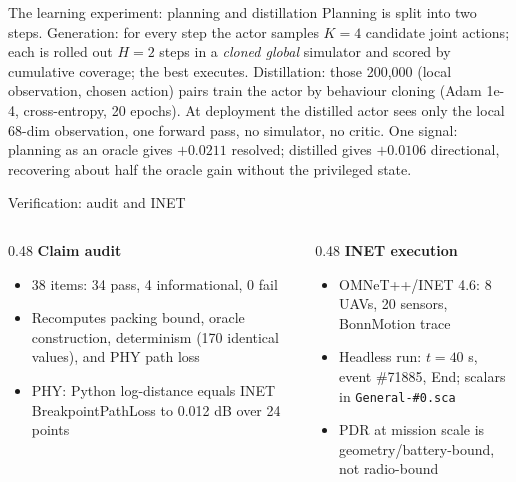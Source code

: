 \documentclass[aspectratio=169,10pt]{beamer}
\begin{document}
\begin{frame}{The learning experiment: planning and distillation}
  \small
  Planning is split into two steps. Generation: for every step the actor samples $K=4$ candidate joint actions; each is rolled out $H=2$ steps in a \emph{cloned global} simulator and scored by cumulative coverage; the best executes. Distillation: those 200,000 (local observation, chosen action) pairs train the actor by behaviour cloning (Adam 1e-4, cross-entropy, 20 epochs). At deployment the distilled actor sees only the local 68-dim observation, one forward pass, no simulator, no critic. One signal: planning as an oracle gives $+0.0211$ resolved; distilled gives $+0.0106$ directional, recovering about half the oracle gain without the privileged state.
\end{frame}

\begin{frame}{Verification: audit and INET}
  \small
  \begin{columns}
    \begin{column}{0.48\textwidth}
      \textbf{Claim audit}
      \begin{itemize}
        \item 38 items: 34 pass, 4 informational, 0 fail
        \item Recomputes packing bound, oracle construction, determinism (170 identical values), and PHY path loss
        \item PHY: Python log-distance equals INET BreakpointPathLoss to 0.012 dB over 24 points
      \end{itemize}
    \end{column}
    \begin{column}{0.48\textwidth}
      \textbf{INET execution}
      \begin{itemize}
        \item OMNeT++/INET 4.6: 8 UAVs, 20 sensors, BonnMotion trace
        \item Headless run: $t=40$ s, event \#71885, End; scalars in \texttt{General-\#0.sca}
        \item PDR at mission scale is geometry/battery-bound, not radio-bound
      \end{itemize}
    \end{column}
  \end{columns}
\end{frame}
\end{document}
